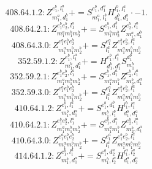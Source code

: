 \documentclass[letterpaper,10pt,fleqn,leqno,onecolumn]{article}
\begin{document}
\begin{equation} \;\;\;\;\;\;  408.64.1.2: Z^{e_{1}^{b},l_{1}^{a}}_{m_{1}^{a},d_{1}^{b}}+=S^{e_{1}^{b},d_{1}^{a}}_{m_{1}^{a},l_{1}^{b}}H^{l_{1}^{b},l_{1}^{a}}_{d_{1}^{b},d_{1}^{a}}\cdot -1. \end{equation}
\begin{equation} \;\;\;\;\;\;  408.64.2.1: Z^{e_{1}^{b}e_{2}^{b},l_{1}^{a}}_{m_{1}^{a}m_{1}^{b}m_{2}^{b}}+=S^{e_{1}^{b},d_{1}^{b}}_{m_{1}^{b}m_{2}^{b}}Z^{e_{2}^{b},l_{1}^{a}}_{m_{1}^{a},d_{1}^{b}} \end{equation}
\begin{equation} \;\;\;\;\;\;  408.64.3.0: Z^{e_{1}^{a}e_{1}^{b}e_{2}^{b}}_{m_{1}^{a}m_{1}^{b}m_{2}^{b}}+=S^{e_{1}^{a}}_{l_{1}^{a}}Z^{e_{1}^{b}e_{2}^{b},l_{1}^{a}}_{m_{1}^{a}m_{1}^{b}m_{2}^{b}} \end{equation}
\begin{equation} \;\;\;\;\;\;  352.59.1.2: Z^{e_{1}^{b},l_{1}^{a}}_{m_{1}^{b},d_{1}^{a}}+=H^{e_{1}^{b},l_{1}^{a}}_{d_{1}^{b},d_{1}^{a}}S^{d_{1}^{b}}_{m_{1}^{b}} \end{equation}
\begin{equation} \;\;\;\;\;\;  352.59.2.1: Z^{e_{1}^{b}e_{2}^{b},l_{1}^{a}}_{m_{1}^{a}m_{1}^{b}m_{2}^{b}}+=S^{e_{1}^{b},d_{1}^{a}}_{m_{1}^{a}m_{1}^{b}}Z^{e_{2}^{b},l_{1}^{a}}_{m_{2}^{b},d_{1}^{a}} \end{equation}
\begin{equation} \;\;\;\;\;\;  352.59.3.0: Z^{e_{1}^{a}e_{1}^{b}e_{2}^{b}}_{m_{1}^{a}m_{1}^{b}m_{2}^{b}}+=S^{e_{1}^{a}}_{l_{1}^{a}}Z^{e_{1}^{b}e_{2}^{b},l_{1}^{a}}_{m_{1}^{a}m_{1}^{b}m_{2}^{b}} \end{equation}
\begin{equation} \;\;\;\;\;\;  410.64.1.2: Z^{e_{1}^{b},l_{1}^{a}}_{m_{1}^{b},d_{1}^{a}}+=S^{e_{1}^{b},d_{1}^{b}}_{m_{1}^{b},l_{1}^{b}}H^{l_{1}^{b},l_{1}^{a}}_{d_{1}^{b},d_{1}^{a}} \end{equation}
\begin{equation} \;\;\;\;\;\;  410.64.2.1: Z^{e_{1}^{b}e_{2}^{b},l_{1}^{a}}_{m_{1}^{a}m_{1}^{b}m_{2}^{b}}+=S^{e_{1}^{b},d_{1}^{a}}_{m_{1}^{a}m_{1}^{b}}Z^{e_{2}^{b},l_{1}^{a}}_{m_{2}^{b},d_{1}^{a}} \end{equation}
\begin{equation} \;\;\;\;\;\;  410.64.3.0: Z^{e_{1}^{a}e_{1}^{b}e_{2}^{b}}_{m_{1}^{a}m_{1}^{b}m_{2}^{b}}+=S^{e_{1}^{a}}_{l_{1}^{a}}Z^{e_{1}^{b}e_{2}^{b},l_{1}^{a}}_{m_{1}^{a}m_{1}^{b}m_{2}^{b}} \end{equation}
\begin{equation} \;\;\;\;\;\;  414.64.1.2: Z^{e_{1}^{b},l_{1}^{a}}_{m_{1}^{b},d_{1}^{a}}+=S^{e_{1}^{b},d_{2}^{a}}_{m_{1}^{b},l_{2}^{a}}H^{l_{1}^{a},l_{2}^{a}}_{d_{1}^{a},d_{2}^{a}} \end{equation}
\end{document}
